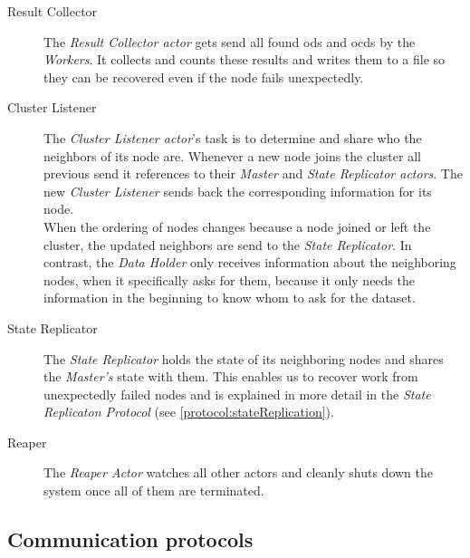\begin{description}
  \item[Result Collector]
  The \emph{Result Collector actor} gets send all found \glspl{od} and \glspl{ocd} by the \emph{Workers}.
  It collects and counts these results and writes them to a file so they can be recovered even if the node fails unexpectedly. 
  
  \item[Cluster Listener]
  The \emph{Cluster Listener actor}'s task is to determine and share who the neighbors of its node are.
  Whenever a new node joins the cluster all previous send it references to their \emph{Master} and \emph{State Replicator actors}.
  The new \emph{Cluster Listener} sends back the corresponding information for its node. \\
  When the ordering of nodes changes because a node joined or left the cluster, the updated neighbors are send to the \emph{State Replicator}.
  In contrast, the \emph{Data Holder} only receives information about the neighboring nodes, when it specifically asks for them, because it only needs the information in the beginning to know whom to ask for the dataset.
  
  \item[State Replicator]
  The \emph{State Replicator} holds the state of its neighboring nodes and shares the \emph{Master's} state with them.
  This enables us to recover work from unexpectedly failed nodes and is explained in more detail in the \emph{State Replicaton Protocol} (see \cref{protocol:stateReplication}).
  
  \item[Reaper] 
  The \emph{Reaper Actor} watches all other actors and cleanly shuts down the system once all of them are terminated.
\end{description}

\subsection{Communication protocols}\label{sec:protocols}

